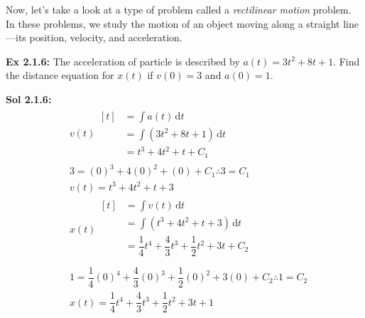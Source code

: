 Now, let's take a look at a type of problem called a \textit{rectilinear motion} problem. In these problems, we study the motion of an object moving along a straight line—its position, velocity, and acceleration. \par

\begin{tcolorbox}[example]
    \textbf{Ex 2.1.6: } The acceleration of particle is described by $a(t) = 3t^2 + 8t + 1$. Find the distance equation for $x(t)$ if $v(0) = 3$ and $a(0) = 1$.
\end{tcolorbox}
\begin{tcolorbox}[solution]
    \textbf{Sol 2.1.6: } \begin{align*}
        & v(t) \begin{aligned}[t]
            & = \int a(t) \,\mathrm{d}t \\[11pt]
            & = \int \left(3t^2 + 8t + 1\right) \,\mathrm{d}t \\[11pt]
            & = t^3 + 4t^2 + t + C_1 
        \end{aligned} \\[11pt]
        & 3 = (0)^3 + 4(0)^2 + (0) + C_1 \therefore 3 = C_1 \\[11pt]
        & v(t) = t^3 + 4t^2 + t + 3 \\[11pt]
        & x(t) \begin{aligned}[t]
            & = \int v(t) \,\mathrm{d}t \\[11pt]
            & = \int \left(t^3 + 4t^2 + t + 3\right) \,\mathrm{d}t \\[11pt]
            & = \dfrac{1}{4}t^4 + \dfrac{4}{3}t^3 + \dfrac{1}{2}t^2 + 3t + C_2 \\[11pt]
        \end{aligned} \\[11pt]
        & 1 = \dfrac{1}{4}(0)^4 + \dfrac{4}{3}(0)^3 + \dfrac{1}{2}(0)^2 + 3(0) + C_2 \therefore 1 = C_2 \\[11pt]
        & \boxed{x(t) = \dfrac{1}{4}t^4 + \dfrac{4}{3}t^3 + \dfrac{1}{2}t^2 + 3t + 1}
    \end{align*}
\end{tcolorbox} \vspace{11pt}

